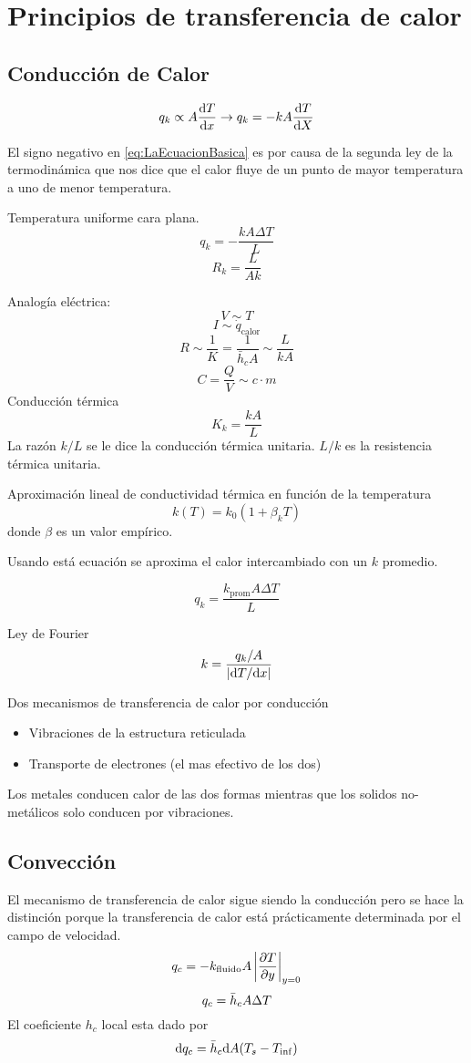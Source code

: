 
\section{Principios de transferencia de calor}
\subsection{Conducción de Calor}
\begin{equation} \label{eq:LaEcuacionBasica}
    q_k\propto A\frac{\textrm{d} T}{\textrm{d} x}\rightarrow q_k=-kA\frac{\textrm{d} T}{\textrm{d} X}
\end{equation}

El signo negativo en \ref{eq:LaEcuacionBasica} es por causa de la segunda ley de la termodinámica que nos dice que el calor fluye de un punto de mayor temperatura a uno de menor temperatura.

Temperatura uniforme cara plana.
$$q_k=-\frac{kA\Delta T}{L} $$
$$R_k=\frac{L}{Ak}$$

Analogía eléctrica:
$$V\sim T $$
$$I \sim \dot{q}_{\text{calor}}$$
$$R\sim\frac{1}{K}= \frac{1}{\bar{h}_cA}\sim \frac{L}{kA} $$
$$C=\frac{Q}{V}\sim c\cdot m \si{}$$
Conducción térmica
$$K_k=\frac{kA}{L}$$
La razón $k/L$ se le dice la conducción térmica unitaria. $L/k$ es la  resistencia térmica unitaria.

Aproximación lineal de conductividad térmica en función de la temperatura
$$k(T)=k_0(1+\beta_kT)$$ donde $\beta$ es un valor empírico.

Usando está ecuación se aproxima el calor intercambiado con un $k$ promedio.

$$q_k=\frac{k_{\textrm{prom}}A\Delta T}{L}$$

Ley de Fourier
$$ k=\frac{q_k/A}{|\textrm{d} T/\textrm{d} x|}$$

Dos mecanismos de transferencia de calor por conducción
\begin{itemize}
    \item Vibraciones de la estructura reticulada
    \item Transporte de electrones (el mas efectivo de los dos)
\end{itemize}
Los metales conducen calor de las dos formas mientras que los solidos no-metálicos solo conducen por vibraciones.
\subsection{Convección}
El mecanismo de transferencia de calor sigue siendo la conducción pero se hace la distinción porque la transferencia de calor está prácticamente determinada por el campo de
velocidad.%
$$q_c=-k_{\textrm{fluido}}A\left| \frac{\partial T}{\partial y}\right|_{y=0} $$
$$q_c=\bar{h}_c A\Delta T $$
El coeficiente $h_c$ local esta dado por
$$ \textrm{d} q_c=\bar{h}_c \textrm{d} A(T_s-T_{\inf}) $$

